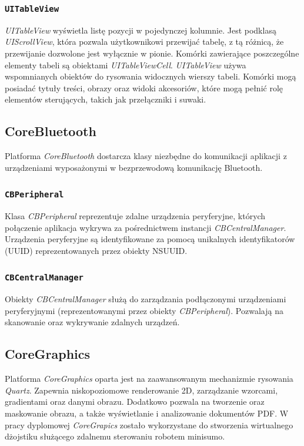 \subsubsection{\lstinline$UITableView$}
\textit{UITableView} wyświetla listę pozycji w pojedynczej kolumnie. Jest podklasą \textit{UIScrollView}, która pozwala użytkownikowi przewijać tabelę, z tą różnicą, że przewijanie dozwolone jest wyłącznie w pionie. Komórki zawierające poszczególne elementy tabeli są obiektami \textit{UITableViewCell}. \textit{UITableView} używa wspomnianych obiektów do rysowania widocznych wierszy tabeli. Komórki mogą posiadać tytuły treści, obrazy oraz widoki akcesoriów, które mogą pełnić rolę elementów sterujących, takich jak przełączniki i suwaki. 

\subsection{CoreBluetooth}
Platforma \textit{CoreBluetooth} dostarcza klasy niezbędne do komunikacji aplikacji z urządzeniami wyposażonymi w bezprzewodową komunikację Bluetooth.

 \subsubsection{\lstinline$CBPeripheral$}
Klasa \textit{CBPeripheral} reprezentuje zdalne urządzenia peryferyjne, których połączenie  aplikacja wykrywa za pośrednictwem instancji \textit{CBCentralManager}. Urządzenia peryferyjne są identyfikowane za pomocą unikalnych identyfikatorów (UUID) reprezentowanych przez obiekty NSUUID. 

 \subsubsection{\lstinline$CBCentralManager$}
Obiekty \textit{CBCentralManager} służą do zarządzania podłączonymi urządzeniami peryferyjnymi (reprezentowanymi przez obiekty \textit{CBPeripheral}). Pozwalają na skanowanie oraz wykrywanie zdalnych urządzeń.

\subsection{CoreGraphics}
Platforma \textit{CoreGraphics} oparta jest na zaawansowanym mechanizmie rysowania \textit{Quartz}. Zapewnia niskopoziomowe renderowanie 2D, zarządzanie wzorcami, gradientami oraz danymi obrazu. Dodatkowo pozwala na tworzenie oraz maskowanie obrazu, a także wyświetlanie i analizowanie dokumentów PDF. W pracy dyplomowej \textit{CoreGrapics} zostało wykorzystane do stworzenia wirtualnego dżojstiku służącego zdalnemu sterowaniu robotem minisumo. 

